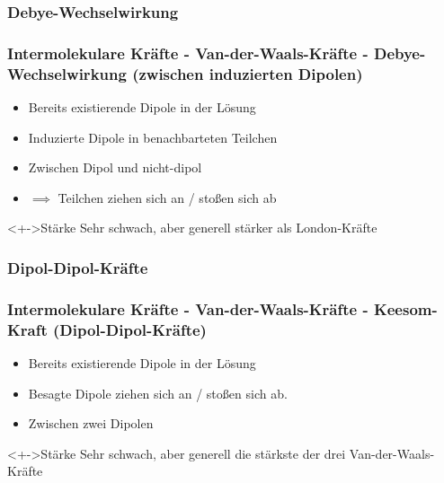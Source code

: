 \subsubsection{Debye-Wechselwirkung}
\begin{frame}
\frametitle{Intermolekulare Kräfte - Van-der-Waals-Kräfte - Debye-Wechselwirkung (zwischen induzierten Dipolen)}
\begin{itemize}
	\item<+-> Bereits existierende Dipole in der Lösung
	\item<+-> Induzierte Dipole in benachbarteten Teilchen
	\item<+-> Zwischen Dipol und nicht-dipol
	\item<+-> $\implies$ Teilchen ziehen sich an / stoßen sich ab
\end{itemize}
\begin{block}<+->{Stärke}
	Sehr schwach, aber generell stärker als London-Kräfte
\end{block}

\end{frame}

\subsubsection{Dipol-Dipol-Kräfte}
\begin{frame}
\frametitle{Intermolekulare Kräfte - Van-der-Waals-Kräfte - Keesom-Kraft (Dipol-Dipol-Kräfte)}
\begin{itemize}
	\item<+-> Bereits existierende Dipole in der Lösung
	\item<+-> Besagte Dipole ziehen sich an / stoßen sich ab.
	\item<+-> Zwischen zwei Dipolen
\end{itemize}
\begin{block}<+->{Stärke}
	Sehr schwach, aber generell die stärkste der drei Van-der-Waals-Kräfte
\end{block}
\end{frame}

